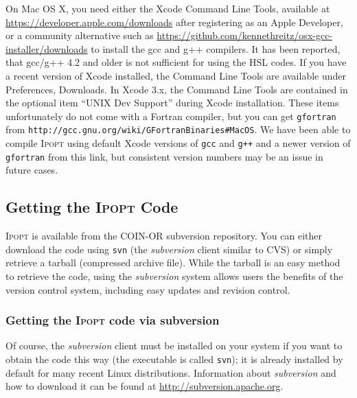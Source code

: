 \documentclass[10pt]{article}
\newcommand{\Ipopt}{\textsc{Ipopt}\xspace}
\begin{document}
On Mac OS X, you need either the Xcode Command Line Tools, available at \url{https://developer.apple.com/downloads} after registering as an Apple Developer, or a community alternative such as \url{https://github.com/kennethreitz/osx-gcc-installer/downloads} to install the gcc and g++ compilers.
It has been reported, that gcc/g++ 4.2 and older is not sufficient for using the HSL codes.
If you have a recent version of Xcode installed, the Command Line Tools are available under Preferences, Downloads. In Xcode 3.x, the Command Line Tools are contained in the optional item ``UNIX Dev Support'' during Xcode installation.
These items unfortunately do not come with a Fortran compiler, but you can get {\tt gfortran} from {\tt http://gcc.gnu.org/wiki/GFortranBinaries\#MacOS}. We have been able to compile \Ipopt using default Xcode versions of {\tt gcc} and {\tt g++} and a newer version of {\tt gfortran} from this link, but consistent version numbers may be an issue in future cases.

\subsection{Getting the \Ipopt Code}
\Ipopt is available from the COIN-OR subversion repository. You can
either download the code using \texttt{svn} (the
\textit{subversion} client similar to CVS) or
simply retrieve a tarball (compressed archive file).  While the
tarball is an easy method to retrieve the code, using the
\textit{subversion} system allows users the benefits of the version
control system, including easy updates and revision control.

\subsubsection{Getting the \Ipopt code via subversion}

Of course, the \textit{subversion} client must be installed on your
system if you want to obtain the code this way (the executable is
called \texttt{svn}); it is already installed by default for many
recent Linux distributions.  Information about \textit{subversion} and
how to download it can be found at
\url{http://subversion.apache.org}.
\end{document}

